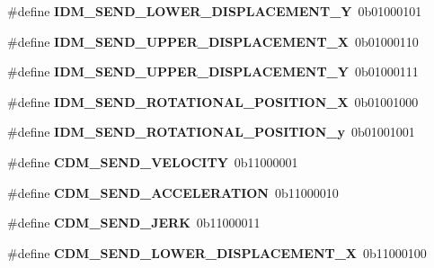 \begin{DoxyCompactItemize}
\item 
\hypertarget{group__cmd__macros_gadc3a4ba7aab3f34dc9e5da5455b97afd}{}\label{group__cmd__macros_gadc3a4ba7aab3f34dc9e5da5455b97afd} 
\#define {\bfseries I\+D\+M\+\_\+\+S\+E\+N\+D\+\_\+\+L\+O\+W\+E\+R\+\_\+\+D\+I\+S\+P\+L\+A\+C\+E\+M\+E\+N\+T\+\_\+Y}~0b01000101
\item 
\hypertarget{group__cmd__macros_ga4c44d40543e95bb615df60569394590f}{}\label{group__cmd__macros_ga4c44d40543e95bb615df60569394590f} 
\#define {\bfseries I\+D\+M\+\_\+\+S\+E\+N\+D\+\_\+\+U\+P\+P\+E\+R\+\_\+\+D\+I\+S\+P\+L\+A\+C\+E\+M\+E\+N\+T\+\_\+X}~0b01000110
\item 
\hypertarget{group__cmd__macros_ga3c47481bdacddaffbfe15089a31dbf8d}{}\label{group__cmd__macros_ga3c47481bdacddaffbfe15089a31dbf8d} 
\#define {\bfseries I\+D\+M\+\_\+\+S\+E\+N\+D\+\_\+\+U\+P\+P\+E\+R\+\_\+\+D\+I\+S\+P\+L\+A\+C\+E\+M\+E\+N\+T\+\_\+Y}~0b01000111
\item 
\hypertarget{group__cmd__macros_ga44e6e82f734a4b7e558ef9a9a6021dc5}{}\label{group__cmd__macros_ga44e6e82f734a4b7e558ef9a9a6021dc5} 
\#define {\bfseries I\+D\+M\+\_\+\+S\+E\+N\+D\+\_\+\+R\+O\+T\+A\+T\+I\+O\+N\+A\+L\+\_\+\+P\+O\+S\+I\+T\+I\+O\+N\+\_\+X}~0b01001000
\item 
\hypertarget{group__cmd__macros_gacfe40c08b1c770b0a2e502057d62e44a}{}\label{group__cmd__macros_gacfe40c08b1c770b0a2e502057d62e44a} 
\#define {\bfseries I\+D\+M\+\_\+\+S\+E\+N\+D\+\_\+\+R\+O\+T\+A\+T\+I\+O\+N\+A\+L\+\_\+\+P\+O\+S\+I\+T\+I\+O\+N\+\_\+y}~0b01001001
\item 
\hypertarget{group__cmd__macros_ga2e68e0dca9b00a34a11642c699dbe3b1}{}\label{group__cmd__macros_ga2e68e0dca9b00a34a11642c699dbe3b1} 
\#define {\bfseries C\+D\+M\+\_\+\+S\+E\+N\+D\+\_\+\+V\+E\+L\+O\+C\+I\+TY}~0b11000001
\item 
\hypertarget{group__cmd__macros_gac47d3d644865df01917937e304221686}{}\label{group__cmd__macros_gac47d3d644865df01917937e304221686} 
\#define {\bfseries C\+D\+M\+\_\+\+S\+E\+N\+D\+\_\+\+A\+C\+C\+E\+L\+E\+R\+A\+T\+I\+ON}~0b11000010
\item 
\hypertarget{group__cmd__macros_ga5f0298301a8266cb8aa6421016a81ec4}{}\label{group__cmd__macros_ga5f0298301a8266cb8aa6421016a81ec4} 
\#define {\bfseries C\+D\+M\+\_\+\+S\+E\+N\+D\+\_\+\+J\+E\+RK}~0b11000011
\item 
\hypertarget{group__cmd__macros_ga4b613c9f9dc8e4cfc4ff92f0d336c448}{}\label{group__cmd__macros_ga4b613c9f9dc8e4cfc4ff92f0d336c448} 
\#define {\bfseries C\+D\+M\+\_\+\+S\+E\+N\+D\+\_\+\+L\+O\+W\+E\+R\+\_\+\+D\+I\+S\+P\+L\+A\+C\+E\+M\+E\+N\+T\+\_\+X}~0b11000100

\end{DoxyCompactItemize}
